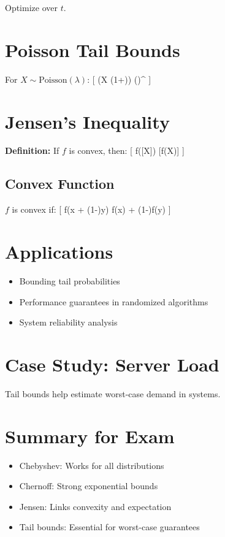 \documentclass[11pt]{article}
\begin{document}
Optimize over $t$.

\section{Poisson Tail Bounds}
For $X \sim \text{Poisson}(\lambda)$:
[
\Pr(X \geq (1+\delta)\lambda) \leq \left(\right)^{\lambda}
]

\section{Jensen's Inequality}

\textbf{Definition:} If $f$ is convex, then:
[
f([X]) \leq {}[f(X)]
]

\subsection{Convex Function}
$f$ is convex if:
[
f(\theta x + (1-\theta)y) \leq \theta f(x) + (1-\theta)f(y)
]

\section{Applications}
\begin{itemize}
\item Bounding tail probabilities
\item Performance guarantees in randomized algorithms
\item System reliability analysis
\end{itemize}

\section{Case Study: Server Load}
Tail bounds help estimate worst-case demand in systems.

\section{Summary for Exam}
\begin{itemize}
\item Chebyshev: Works for all distributions
\item Chernoff: Strong exponential bounds
\item Jensen: Links convexity and expectation
\item Tail bounds: Essential for worst-case guarantees
\end{itemize}
\end{document}
